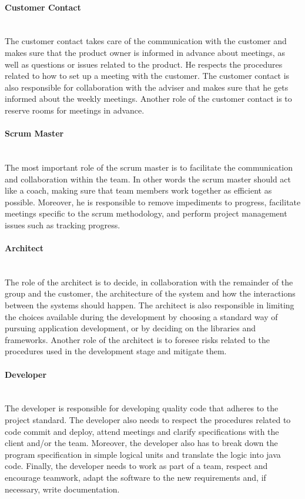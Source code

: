 \documentclass[../document.tex]{subfiles}
\begin{document}
\paragraph{Customer Contact} \ \\
The customer contact takes care of the communication with the customer and makes sure that the product owner is informed in advance about meetings, as well as questions or issues related to the product. He respects the procedures related to how to set up a meeting with the customer. The customer contact is also responsible for collaboration with the adviser and makes sure that he gets informed about the weekly meetings. Another role of the customer contact is to reserve rooms for meetings in advance.

\paragraph{Scrum Master} \ \\
The most important role of the scrum master is to facilitate the communication and collaboration within the team. In other words the scrum master should act like a coach, making sure that team members work together as efficient as possible. Moreover, he is responsible to remove impediments to progress, facilitate meetings specific to the scrum methodology, and perform project management issues such as tracking progress. 

\paragraph{Architect} \ \\
The role of the architect is to decide, in collaboration with the remainder of the group and the customer, the architecture of the system and how the interactions between the systems should happen. The architect is also responsible in limiting the choices available during the development by choosing a standard way of pursuing application development, or by deciding on the libraries and frameworks. Another role of the architect is to foresee risks related to the procedures used in the development stage and mitigate them. 

\paragraph{Developer} \ \\
The developer is responsible for developing quality code that adheres to the project standard. The developer also needs to respect the procedures related to code commit and deploy, attend meetings and clarify specifications with the client and/or the team. Moreover, the developer also has to break down the program specification in simple logical units and translate the logic into java code. Finally, the developer needs to work as part of a team, respect and encourage teamwork, adapt the software to the new requirements and, if necessary, write documentation.
\end{document}
